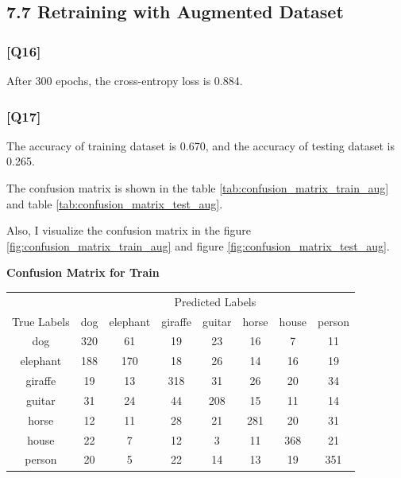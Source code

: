 \documentclass{article}
\begin{document}
\subsection*{7.7 Retraining with Augmented Dataset}

\subsubsection*{[Q16]}

After 300 epochs, the cross-entropy loss is 0.884.

\subsubsection*{[Q17]}
The accuracy of training dataset is 0.670, and the accuracy of testing dataset is 0.265.

The confusion matrix is shown in the table \ref{tab:confusion_matrix_train_aug} and table \ref{tab:confusion_matrix_test_aug}.

Also, I visualize the confusion matrix in the figure \ref{fig:confusion_matrix_train_aug} and figure \ref{fig:confusion_matrix_test_aug}.

\begin{center}
    \textbf{Confusion Matrix for Train}
    
    \begin{tabular}{c|ccccccc}
    \toprule
    & \multicolumn{7}{c}{Predicted Labels} \\
    \cmidrule(lr){2-8}
    True Labels & dog & elephant & giraffe & guitar & horse & house & person \\
    \midrule
    dog & 320 & 61 & 19 & 23 & 16 & 7 & 11 \\
    elephant & 188 & 170 & 18 & 26 & 14 & 16 & 19 \\
    giraffe & 19 & 13 & 318 & 31 & 26 & 20 & 34 \\
    guitar & 31 & 24 & 44 & 208 & 15 & 11 & 14 \\
    horse & 12 & 11 & 28 & 21 & 281 & 20 & 31 \\
    house & 22 & 7 & 12 & 3 & 11 & 368 & 21 \\
    person & 20 & 5 & 22 & 14 & 13 & 19 & 351 \\
    \bottomrule
    \end{tabular}
    \label{tab:confusion_matrix_train_aug}
\end{center}
    
\end{document}
